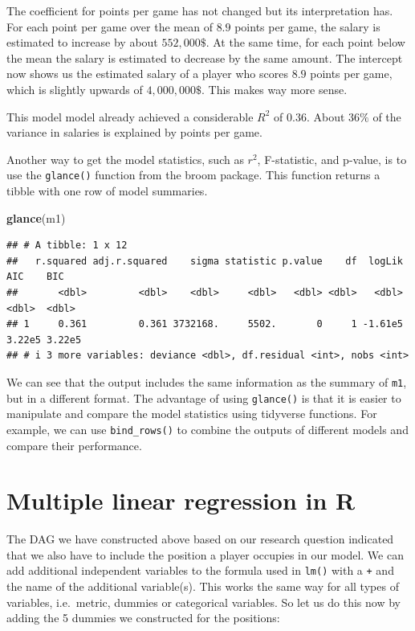 \documentclass[
]{book}
\newenvironment{Shaded}{\begin{snugshade}}{\end{snugshade}}
\newcommand{\FunctionTok}[1]{\textcolor[rgb]{0.13,0.29,0.53}{\textbf{#1}}}
\newcommand{\NormalTok}[1]{#1}
\begin{document}
The coefficient for points per game has not changed but its
interpretation has. For each point per game over the mean of \(8.9\)
points per game, the salary is estimated to increase by about
\(552,000\$\). At the same time, for each point below the mean the salary
is estimated to decrease by the same amount. The intercept now shows us
the estimated salary of a player who scores \(8.9\) points per game, which
is slightly upwards of \(4,000,000\$\). This makes way more sense.

This model model already achieved a considerable \(R^2\) of \(0.36\). About
\(36\%\) of the variance in salaries is explained by points per game.

Another way to get the model statistics, such as \(r^2\), F-statistic, and
p-value, is to use the \texttt{glance()} function from the broom package. This
function returns a tibble with one row of model summaries.

\begin{Shaded}
\begin{Highlighting}[]
\FunctionTok{glance}\NormalTok{(m1)}
\end{Highlighting}
\end{Shaded}

\begin{verbatim}
## # A tibble: 1 x 12
##   r.squared adj.r.squared    sigma statistic p.value    df  logLik    AIC    BIC
##       <dbl>         <dbl>    <dbl>     <dbl>   <dbl> <dbl>   <dbl>  <dbl>  <dbl>
## 1     0.361         0.361 3732168.     5502.       0     1 -1.61e5 3.22e5 3.22e5
## # i 3 more variables: deviance <dbl>, df.residual <int>, nobs <int>
\end{verbatim}

We can see that the output includes the same information as the summary
of \texttt{m1}, but in a different format. The advantage of using \texttt{glance()} is
that it is easier to manipulate and compare the model statistics using
tidyverse functions. For example, we can use \texttt{bind\_rows()} to combine
the outputs of different models and compare their performance.

\hypertarget{multiple-linear-regression-in-r}{%
\section{Multiple linear regression in R}\label{multiple-linear-regression-in-r}}

The DAG we have constructed above based on our research question
indicated that we also have to include the position a player occupies in
our model. We can add additional independent variables to the formula
used in \texttt{lm()} with a \texttt{+} and the name of the additional variable(s).
This works the same way for all types of variables, i.e.~metric, dummies
or categorical variables. So let us do this now by adding the 5 dummies
we constructed for the positions:
\end{document}
